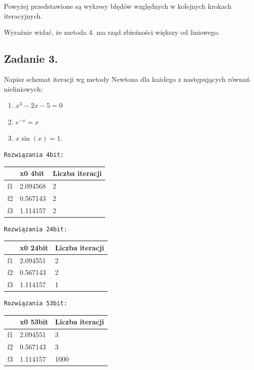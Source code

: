 \documentclass[
  letterpaper,
  DIV=11,
  numbers=noendperiod]{scrartcl}
\begin{document}
Powyżej przedstawione są wykresy błędów względnych w kolejnych krokach
iteracyjnych.

Wyraźnie widać, że metoda 4. ma rząd zbieżności większy od liniowego.

\subsection{Zadanie 3.}\label{zadanie-3.}

Napisz schemat iteracji wg metody Newtona dla każdego z następujących
równań nieliniowych:

\begin{enumerate}
\def\labelenumi{\alph{enumi})}
\item
  \(x^3 - 2x - 5 = 0\)
\item
  \(e^{-x} = x\)
\item
  \(x\sin(x) = 1\).
\end{enumerate}

\begin{verbatim}
Rozwiązania 4bit:
\end{verbatim}

\begin{longtable}[]{@{}lll@{}}
\toprule\noalign{}
& x0 4bit & Liczba iteracji \\
\midrule\noalign{}
\endhead
\bottomrule\noalign{}
\endlastfoot
f1 & 2.094568 & 2 \\
f2 & 0.567143 & 2 \\
f3 & 1.114157 & 2 \\
\end{longtable}

\begin{verbatim}
Rozwiązania 24bit:
\end{verbatim}

\begin{longtable}[]{@{}lll@{}}
\toprule\noalign{}
& x0 24bit & Liczba iteracji \\
\midrule\noalign{}
\endhead
\bottomrule\noalign{}
\endlastfoot
f1 & 2.094551 & 2 \\
f2 & 0.567143 & 2 \\
f3 & 1.114157 & 1 \\
\end{longtable}

\begin{verbatim}
Rozwiązania 53bit:
\end{verbatim}

\begin{longtable}[]{@{}lll@{}}
\toprule\noalign{}
& x0 53bit & Liczba iteracji \\
\midrule\noalign{}
\endhead
\bottomrule\noalign{}
\endlastfoot
f1 & 2.094551 & 3 \\
f2 & 0.567143 & 3 \\
f3 & 1.114157 & 1000 \\
\end{longtable}
\end{document}
